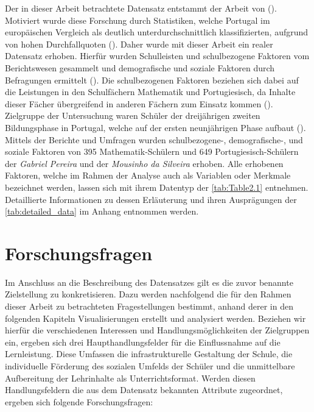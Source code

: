 Der in dieser Arbeit betrachtete Datensatz entstammt der Arbeit von (\cite[]{Cortez2008UsingDM}).
Motiviert wurde diese Forschung durch Statistiken, welche Portugal im europäischen Vergleich als deutlich unterdurchschnittlich klassifizierten, aufgrund von hohen Durchfallquoten (\cite[S. 1]{Cortez2008UsingDM}).
Daher wurde mit dieser Arbeit ein realer Datensatz erhoben.
Hierfür wurden Schulleisten und schulbezogene Faktoren vom Berichtswesen gesammelt und demografische und soziale Faktoren durch Befragungen ermittelt (\cite[S. 1]{Cortez2008UsingDM}).
Die schulbezogenen Faktoren beziehen sich dabei auf die Leistungen in den Schulfächern Mathematik und Portugiesisch, da Inhalte dieser Fächer übergreifend in anderen Fächern zum Einsatz kommen (\cite[S. 2]{Cortez2008UsingDM}).
Zielgruppe der Untersuchung waren Schüler der dreijährigen zweiten Bildungsphase in Portugal, welche auf der ersten neunjährigen Phase aufbaut (\cite[S. 2]{Cortez2008UsingDM}).
Mittels der Berichte und Umfragen wurden schulbezogene-, demografische-, und soziale Faktoren von 395 Mathematik-Schülern und 649 Portugiesisch-Schülern der \textit{Gabriel Pereira} und der \textit{Mousinho da Silveira} erhoben.
Alle erhobenen Faktoren, welche im Rahmen der Analyse auch als Variablen oder Merkmale bezeichnet werden, lassen sich mit ihrem Datentyp der \autoref{tab:Table2.1} entnehmen. 
Detaillierte Informationen zu dessen Erläuterung und ihren Ausprägungen der \autoref{tab:detailed_data} im Anhang entnommen werden.




\section[Forschungsfragen]{Forschungsfragen}

Im Anschluss an die Beschreibung des Datensatzes gilt es die zuvor benannte Zielstellung zu konkretisieren. 
Dazu werden nachfolgend die für den Rahmen dieser Arbeit zu betrachteten Fragestellungen bestimmt, anhand derer in den folgenden Kapiteln Visualisierungen erstellt und analysiert werden.
Beziehen wir hierfür die verschiedenen Interessen und Handlungsmöglichkeiten der Zielgruppen ein, ergeben sich drei Haupthandlungsfelder für die Einflussnahme auf die Lernleistung.
Diese Umfassen die infrastrukturelle Gestaltung der Schule, die individuelle Förderung des sozialen Umfelds der Schüler und die unmittelbare Aufbereitung der Lehrinhalte als Unterrichtsformat.
Werden diesen Handlungsfeldern die aus dem Datensatz bekannten Attribute zugeordnet, ergeben sich folgende Forschungsfragen:

